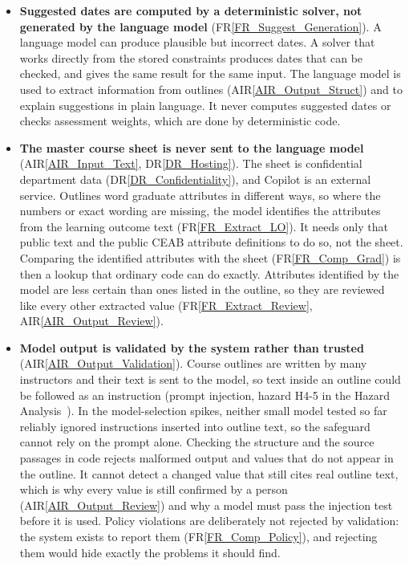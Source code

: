 \documentclass[12pt]{article}
\newcommand{\rref}[1]{FR\ref{#1}}
\newcommand{\drref}[1]{DR\ref{#1}}
\newcommand{\airref}[1]{AIR\ref{#1}}
\begin{document}
\begin{itemize}
\item \textbf{Suggested dates are computed by a deterministic solver, not
  generated by the language model} (\rref{FR_Suggest_Generation}). A language
  model can produce plausible but incorrect dates. A solver that works directly
  from the stored constraints produces dates that can be checked, and gives the
  same result for the same input. The language model is used to extract
  information from outlines (\airref{AIR_Output_Struct}) and to explain
  suggestions in plain language. It never computes suggested dates or checks
  assessment weights, which are done by deterministic code.

\item \textbf{The master course sheet is never sent to the language model}
  (\airref{AIR_Input_Text}, \drref{DR_Hosting}). The sheet is confidential
  department data (\drref{DR_Confidentiality}), and Copilot is an external
  service. Outlines word graduate attributes in different ways, so where the
  numbers or exact wording are missing, the model identifies the attributes from
  the learning outcome text (\rref{FR_Extract_LO}). It needs only that public
  text and the public CEAB attribute definitions to do so, not the sheet.
  Comparing the identified attributes with the sheet (\rref{FR_Comp_Grad}) is
  then a lookup that ordinary code can do exactly. Attributes identified by the
  model are less certain than ones listed in the outline, so they are reviewed
  like every other extracted value (\rref{FR_Extract_Review},
  \airref{AIR_Output_Review}).

\item \textbf{Model output is validated by the system rather than trusted}
  (\airref{AIR_Output_Validation}). Course outlines are written by many
  instructors and their text is sent to the model, so text inside an outline
  could be followed as an instruction (prompt injection, hazard H4-5 in the
  Hazard Analysis~\citep{TeamBVSH2026HA}). In the model-selection spikes,
  neither small model tested so far reliably ignored instructions inserted into
  outline text, so the safeguard cannot rely on the prompt alone. Checking the
  structure and the source passages in code rejects malformed output and values
  that do not appear in the outline. It cannot detect a changed value that still
  cites real outline text, which is why every value is still confirmed by a
  person (\airref{AIR_Output_Review}) and why a model must pass the injection
  test before it is used. Policy violations are deliberately not rejected by
  validation: the system exists to report them (\rref{FR_Comp_Policy}), and
  rejecting them would hide exactly the problems it should find.
\end{itemize}
\end{document}
